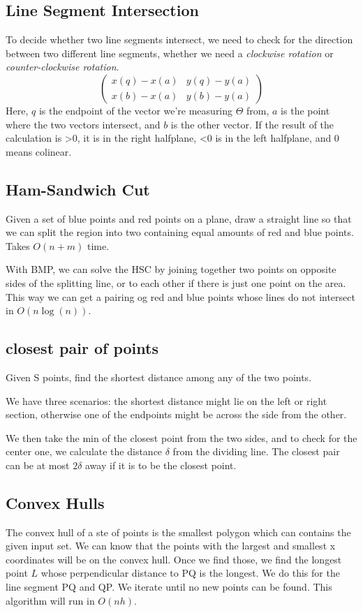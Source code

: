 \documentclass[portrait,10pt, a4paper]{article}
\begin{document}
\begin{multicols*}{3}
	\subsection{Line Segment Intersection}
		To decide whether two line segments intersect, we need to check for the direction between two different
		line segments, whether we need a \textit{clockwise rotation} or \textit{counter-clockwise rotation}.
		\begin{equation}
				\left(\begin{array}{cc} x(q)-x(a) & y(q)-y(a) \\x(b)-x(a) & y(b)-y(a)\end{array}\right)
		\end{equation}
		Here, $q$ is the endpoint of the vector we're measuring $\Theta$ from, $a$ is the point
		where the two vectors intersect, and $b$ is the other vector. If the result of the calculation is >0,
		it is in the right halfplane, <0 is in the left halfplane, and 0 means colinear. 
		
	\subsection{Ham-Sandwich Cut}
		Given a set of blue points and red points on a plane, draw a straight line so that we can split the
		region into two containing equal amounts of red and blue points. Takes $O(n+m)$ time.
		
		With BMP, we can solve the HSC by joining together two points on opposite sides of the splitting line,
		or to each other if there is just one point on the area. This way we can get a pairing og red and blue
		points whose lines do not intersect in $O(n\log(n))$.
	
	\subsection{closest pair of points}
		Given S points, find the shortest distance among any of the two points.

		We have three scenarios: the shortest distance might lie on the left or right section, otherwise one 
		of the endpoints might be across the side from the other.

		We then take the min of the closest point from the two sides, and to check for the center one, we 
		calculate the distance $\delta$ from the dividing line. The closest pair can be at most $2\delta$ away
		if it is to be the closest point.
	\subsection{Convex Hulls}
		The convex hull of a ste of points is the smallest polygon which can contains the given input set.
		We can know that the points with the largest and smallest x coordinates will be on the convex hull.
		Once we find those, we find the longest point $L$ whose perpendicular distance to PQ is the longest.
		We do this for the line segment PQ and QP. We iterate until no new points can be found. This algorithm
		will run in $O(nh)$.

\end{multicols*}
\end{document}
